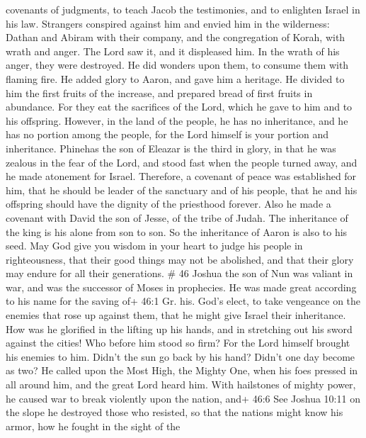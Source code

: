 covenants of judgments, to teach Jacob the testimonies, and to enlighten
Israel in his law.  Strangers conspired against him and
envied him in the wilderness: Dathan and Abiram with their company, and
the congregation of Korah, with wrath and anger.  The Lord
saw it, and it displeased him. In the wrath of his anger, they were
destroyed. He did wonders upon them, to consume them with flaming fire.
 He added glory to Aaron, and gave him a heritage. He
divided to him the first fruits of the increase, and prepared bread of
first fruits in abundance.  For they eat the sacrifices of
the Lord, which he gave to him and to his offspring. 
However, in the land of the people, he has no inheritance, and he has no
portion among the people, for the Lord himself is your portion and
inheritance.  Phinehas the son of Eleazar is the third in
glory, in that he was zealous in the fear of the Lord, and stood fast
when the people turned away, and he made atonement for Israel.
 Therefore, a covenant of peace was established for him,
that he should be leader of the sanctuary and of his people, that he and
his offspring should have the dignity of the priesthood forever.
 Also he made a covenant with David the son of Jesse, of
the tribe of Judah. The inheritance of the king is his alone from son to
son. So the inheritance of Aaron is also to his seed.  May
God give you wisdom in your heart to judge his people in righteousness,
that their good things may not be abolished, and that their glory may
endure for all their generations. \# 46  Joshua the son of
Nun was valiant in war, and was the successor of Moses in prophecies. He
was made great according to his name for the saving of+ 46:1 Gr. his.
God's elect, to take vengeance on the enemies that rose up against them,
that he might give Israel their inheritance.  How was he
glorified in the lifting up his hands, and in stretching out his sword
against the cities!  Who before him stood so firm? For the
Lord himself brought his enemies to him.  Didn't the sun go
back by his hand? Didn't one day become as two?  He called
upon the Most High, the Mighty One, when his foes pressed in all around
him, and the great Lord heard him.  With hailstones of
mighty power, he caused war to break violently upon the nation, and+
46:6 See Joshua 10:11 on the slope he destroyed those who resisted, so
that the nations might know his armor, how he fought in the sight of the
